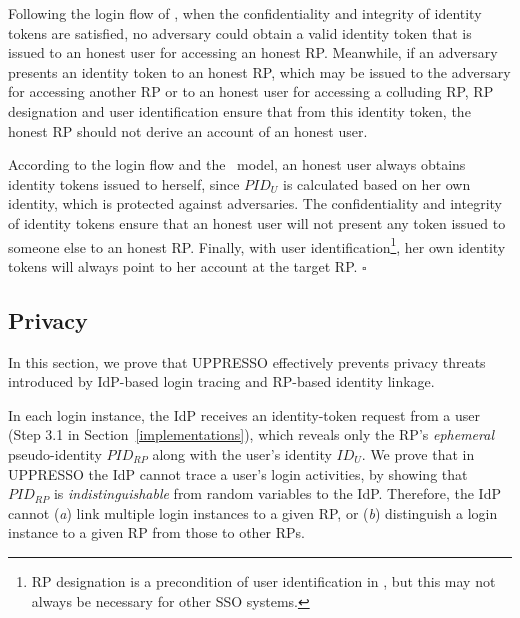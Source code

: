 Following the login flow of \usso, when the confidentiality and integrity of identity tokens are satisfied, no adversary could obtain a valid identity token that is issued to an honest user for accessing an honest RP. %
Meanwhile, if an adversary presents an identity token to an honest RP, which may be issued to the adversary for accessing another RP or to an honest user for accessing a colluding RP, RP designation and user identification ensure that from this identity token, the honest RP should not derive an account of an honest user.

According to the login flow and the \dyu~model, an honest user always obtains identity tokens issued to herself, since $PID_U$ is calculated based on her own identity, which is protected against adversaries. The confidentiality and integrity of identity tokens ensure that an honest user will not present any token issued to someone else to an honest RP. Finally, with user identification\footnote{RP designation is a precondition of user identification in \usso, but this may not always be necessary for other SSO systems.}, her own identity tokens will always point to her account at the target RP.
\hfill $\square$


\subsection{Privacy}
\label{sec-:analysis}
In this section, we prove that UPPRESSO effectively prevents privacy threats introduced by IdP-based login tracing and RP-based identity linkage.

\newc In each login instance, the IdP receives an identity-token request from a user (Step 3.1 in Section~\ref{implementations}),
 which reveals only the RP's \emph{ephemeral} pseudo-identity $PID_{RP}$ along with the user's identity $ID_U$.
We prove that in UPPRESSO the IdP cannot trace a user's login activities,
 by showing that $PID_{RP}$ is \emph{indistinguishable} from random variables to the IdP.
Therefore,
    the IdP cannot (\emph{a}) link multiple login instances to a given RP,
        or (\emph{b}) distinguish a login instance to a given RP from those to other RPs.

